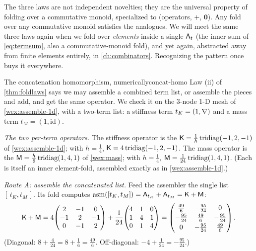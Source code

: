 \begin{remark}
The three laws are not independent novelties; they are the universal property of
folding over a commutative monoid, specialized to (operators, $+$, $\mathbf 0$).
Any fold over any commutative monoid satisfies the analogues. We will meet the
same three laws again when we fold over \emph{elements} inside a single
$\mathsf{A}_t$ (the inner sum of \cref{eq:termsum}, also a commutative-monoid fold),
and yet again, abstracted away from finite elements entirely, in
\cref{ch:combinators}. Recognizing the pattern once buys it everywhere.
\end{remark}

\begin{workedexample}{The concatenation homomorphism, numerically}{concat-homo}
\label{wex:concat-homo}
Law (ii) of \cref{thm:foldlaws} says we may assemble a combined term list, or
assemble the pieces and add, and get the same operator. We check it on the
$3$-node 1-D mesh of \cref{wex:assemble-1d}, with a two-term list: a stiffness
term $t_K=(1,\nabla)$ and a mass term $t_M=(1,\mathrm{id})$.

\emph{The two per-term operators.} The stiffness operator is the
$\mathsf{K}=\tfrac1h\operatorname{tridiag}(-1,2,-1)$ of \cref{wex:assemble-1d}; with
$h=\tfrac14$, $\mathsf{K}=4\operatorname{tridiag}(-1,2,-1)$. The mass operator is the
$\mathsf{M}=\tfrac h6\operatorname{tridiag}(1,4,1)$ of \cref{wex:mass}; with
$h=\tfrac14$, $\mathsf{M}=\tfrac1{24}\operatorname{tridiag}(1,4,1)$. (Each is itself
an inner element-fold, assembled exactly as in \cref{wex:assemble-1d}.)

\emph{Route A: assemble the concatenated list.} Feed the assembler the single
list $[\,t_K,t_M\,]$. Its fold computes
$\mathrm{asm}([t_K,t_M])=\mathsf{A}_{t_K}+\mathsf{A}_{t_M}=\mathsf{K}+\mathsf{M}$:
\[
\mathsf{K}+\mathsf{M}
=4\!\begin{pmatrix}2&-1&0\\-1&2&-1\\0&-1&2\end{pmatrix}
+\frac1{24}\!\begin{pmatrix}4&1&0\\1&4&1\\0&1&4\end{pmatrix}
=\begin{pmatrix}
\tfrac{49}{6} & -\tfrac{95}{24} & 0\\[2pt]
-\tfrac{95}{24} & \tfrac{49}{6} & -\tfrac{95}{24}\\[2pt]
0 & -\tfrac{95}{24} & \tfrac{49}{6}
\end{pmatrix}.
\]
(Diagonal: $8+\tfrac{4}{24}=8+\tfrac16=\tfrac{49}{6}$. Off-diagonal:
$-4+\tfrac{1}{24}=-\tfrac{95}{24}$.)


\end{workedexample}
